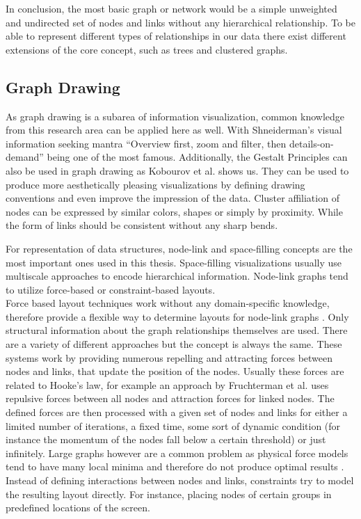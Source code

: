 In conclusion, the most basic graph or network would be a simple unweighted and undirected set of nodes and links without any hierarchical relationship. To be able to represent different types of relationships in our data there exist different extensions of the core concept, such as trees and clustered graphs. 

\subsection{Graph Drawing}

As graph drawing is a subarea of information visualization, common knowledge from this research area can be applied here as well. With Shneiderman's visual information seeking mantra \label{seeking mantra} “Overview first, zoom and filter, then details-on-demand” \cite{shneiderman_eyes_1996} being one of the most famous. Additionally, the Gestalt Principles can also be used in graph drawing as Kobourov et al.
\cite{kobourov_gestalt_2015} shows us. They can be used to produce more aesthetically pleasing visualizations by defining drawing conventions and even improve the impression of the data. Cluster affiliation of nodes can be expressed by similar colors, shapes or simply by proximity. While the form of links should be consistent without any sharp bends.

For representation of data structures, node-link and space-filling concepts are the most important ones used in this thesis. Space-filling visualizations usually use multiscale approaches to encode hierarchical information. Node-link graphs tend to utilize force-based or constraint-based layouts\cite{von_landesberger_visual_2011}.\\
Force based\label{exp:force_based_background} layout techniques work without any domain-specific knowledge, therefore provide a flexible way to determine layouts for node-link graphs \cite{kobourov_spring_2012}. Only structural information about the graph relationships themselves are used. 
There are a variety of different approaches but the concept is always the same. 
These systems work by providing numerous repelling and attracting forces between nodes and links, that update the position of the nodes. Usually these forces are related to Hooke's law, for example an approach by Fruchterman et al. \cite{fruchterman_graph_1991} uses repulsive forces between all nodes and attraction forces for linked nodes.
The defined forces are then processed with a given set of nodes and links for either a limited number of iterations, a fixed time, some sort of dynamic condition (for instance the momentum of the nodes fall below a certain threshold) or just infinitely.
Large graphs however are a common problem as physical force models tend to have many local minima and therefore do not produce optimal results \cite{kobourov_spring_2012}.\\
Instead of defining interactions between nodes and links, constraints try to model the resulting layout directly. For instance, placing nodes of certain groups in predefined locations of the screen.   

